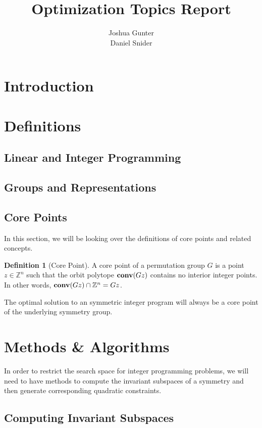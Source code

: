 \documentclass[11pt]{article} %
\title{Optimization Topics Report}
\author{Joshua Gunter\\  Daniel Snider}
\theoremstyle{definition}
\newtheorem{definition}{Definition}[section]
\begin{document}
\maketitle

\section{Introduction}

\section{Definitions}

\subsection{Linear and Integer Programming}

\subsection{Groups and Representations}

\subsection{Core Points}

In this section, we will be looking over the definitions of core points and related concepts.

\begin{definition}[Core Point]
A core point of a permutation group $G$ is a point $z \in \mathbb{Z}^n$ such that the orbit polytope $\textrm{\textbf{conv}}(Gz)$ contains no interior integer points. In other words, $\textrm{\textbf{conv}}(Gz) \cap \mathbb{Z}^n = Gz$.
\end{definition}

The optimal solution to an symmetric integer program will always be a core point of the underlying symmetry group.

\section{Methods \& Algorithms}

In order to restrict the search space for integer programming problems, we will need to have methods to compute the invariant subspaces of a symmetry and then generate corresponding quadratic constraints.

\subsection{Computing Invariant Subspaces}
\end{document}
